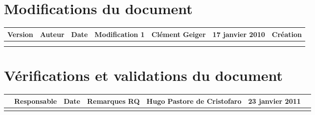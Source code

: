 
\section*{Modifications du document}

\begin{center}
\begin{longtable}{|m{14mm}||m{36mm}|m{36mm}|m{60mm}|}
\hline
Version & Auteur & Date & Modification\endhead \hline
1
& %
Clément Geiger
& %
17 janvier 2010
& %
Création
\\\hline

& %

& %

& %

\\\hline

& %

& %

& %

\\\hline
\end{longtable}
\end{center}


\section*{Vérifications et validations du document}

\begin{center}
\begin{longtable}{|m{15mm}|m{36mm}|m{36mm}|m{60mm}|}
\hline
 & Responsable & Date & Remarques\endhead \hline
RQ
& %
Hugo Pastore de Cristofaro
& %
23 janvier 2011
& %

\\\hline

& %

& %

& %

\\\hline
\end{longtable}
\end{center}

\pagebreak

